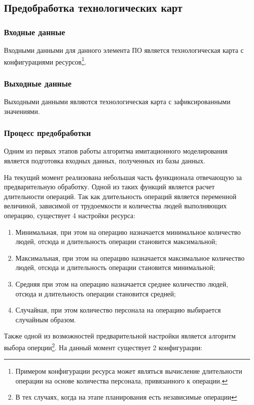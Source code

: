 \subsection{Предобработка технологических карт}

\subsubsection{Входные данные}
Входными данными для данного элемента ПО является технологическая карта с конфигурациями ресурсов\footnote{Примером конфигурации ресурса может являться вычисление длительности операции на основе количества персонала, привязанного к операции.}. 

\subsubsection{Выходные данные}
Выходными данными являются технологическая карта с зафиксированными значениями.

\subsubsection{Процесс предобработки}
Одним из первых этапов работы алгоритма имитационного моделирования является подготовка входных данных, полученных из базы данных. 

На текущий момент реализована небольшая часть функционала отвечающую за предварительную обработку. Одной из таких функций является расчет длительности операций. Так как длительность операций является переменной величиной, зависимой от трудоемкости и количества людей выполняющих операцию, существует 4 настройки ресурса:

\begin{enumerate}
    \item Минимальная, при этом на операцию назначается минимальное количество людей, отсюда и длительность операции становится максимальной;
    \item Максимальная, при этом на операцию назначается максимальное количество людей, отсюда и длительность операции становится минимальной;
    \item Средняя при этом на операцию назначается среднее количество людей, отсюда и длительность операции становится средней;
    \item Случайная, при этом количество персонала на операцию выбирается случайным образом. 
\end{enumerate}

Также одной из возможностей предварительной настройки является алгоритм выбора оперции\footnote{В тех случаях, когда на этапе планирования есть независимые операции}. На данный момент существует 2 конфигурации:

